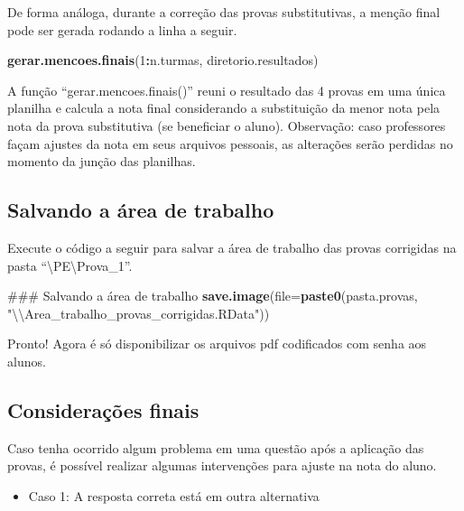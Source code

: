 \documentclass[a4paper]{report}
\newenvironment{Shaded}{\begin{snugshade}}{\end{snugshade}}
\newcommand{\KeywordTok}[1]{\textcolor[rgb]{0.13,0.29,0.53}{\textbf{#1}}}
\newcommand{\DataTypeTok}[1]{\textcolor[rgb]{0.13,0.29,0.53}{#1}}
\newcommand{\DecValTok}[1]{\textcolor[rgb]{0.00,0.00,0.81}{#1}}
\newcommand{\CharTok}[1]{\textcolor[rgb]{0.31,0.60,0.02}{#1}}
\newcommand{\StringTok}[1]{\textcolor[rgb]{0.31,0.60,0.02}{#1}}
\newcommand{\OperatorTok}[1]{\textcolor[rgb]{0.81,0.36,0.00}{\textbf{#1}}}
\newcommand{\NormalTok}[1]{#1}
\providecommand{\tightlist}{%
  \setlength{\itemsep}{0pt}\setlength{\parskip}{0pt}}
\begin{document}
De forma análoga, durante a correção das provas substitutivas, a menção
final pode ser gerada rodando a linha a seguir.

\begin{Shaded}
\begin{Highlighting}[]
\KeywordTok{gerar.mencoes.finais}\NormalTok{(}\DecValTok{1}\OperatorTok{:}\NormalTok{n.turmas, diretorio.resultados)}
\end{Highlighting}
\end{Shaded}

A função ``gerar.mencoes.finais()'' reuni o resultado das 4 provas em
uma única planilha e calcula a nota final considerando a substituição da
menor nota pela nota da prova substitutiva (se beneficiar o aluno).
Observação: caso professores façam ajustes da nota em seus arquivos
pessoais, as alterações serão perdidas no momento da junção das
planilhas.

\subsection{Salvando a área de trabalho}

Execute o código a seguir para salvar a área de trabalho das provas
corrigidas na pasta ``\textbackslash{}PE\textbackslash{}Prova\_1''.

\begin{Shaded}
\begin{Highlighting}[]
\NormalTok{### Salvando a área de trabalho}
\KeywordTok{save.image}\NormalTok{(}\DataTypeTok{file=}\KeywordTok{paste0}\NormalTok{(pasta.provas, }\StringTok{"}\CharTok{\textbackslash{}\textbackslash{}}\StringTok{Area_trabalho_provas_corrigidas.RData"}\NormalTok{))}
\end{Highlighting}
\end{Shaded}

Pronto! Agora é só disponibilizar os arquivos pdf codificados com senha
aos alunos.

\subsection{Considerações finais}

Caso tenha ocorrido algum problema em uma questão após a aplicação das
provas, é possível realizar algumas intervenções para ajuste na nota do
aluno.

\begin{itemize}
\tightlist
\item
  Caso 1: A resposta correta está em outra alternativa
\end{itemize}
\end{document}
